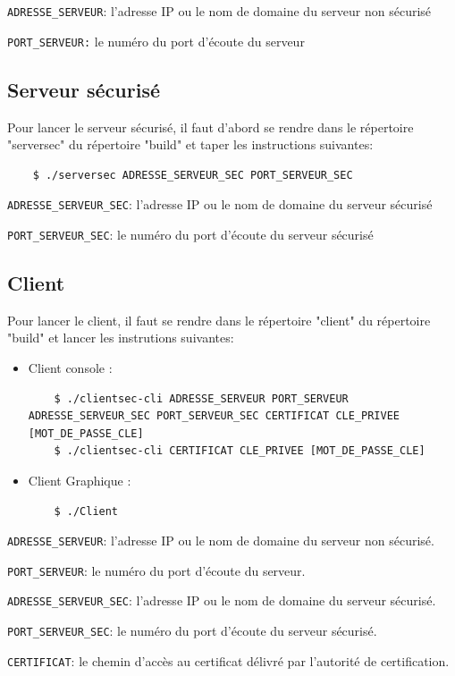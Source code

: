 \documentclass[a4paper,11pt,french]{book}
\begin{document}
\verb+ADRESSE_SERVEUR+: l'adresse IP ou le nom de domaine du serveur non sécurisé

\verb+PORT_SERVEUR:+ le numéro du port d'écoute du serveur

\subsection{Serveur sécurisé}
Pour lancer le serveur sécurisé, il faut d'abord se rendre dans le répertoire "serversec" du répertoire "build" et taper les instructions suivantes:
\begin{verbatim}
    $ ./serversec ADRESSE_SERVEUR_SEC PORT_SERVEUR_SEC
\end{verbatim}

\verb+ADRESSE_SERVEUR_SEC+: l'adresse IP ou le nom de domaine du serveur sécurisé

\verb+PORT_SERVEUR_SEC+: le numéro du port d'écoute du serveur sécurisé

\subsection{Client}
Pour lancer le client, il faut se rendre dans le répertoire "client" du répertoire "build" et lancer les instrutions suivantes:
\begin{itemize}
\item Client console : 
\begin{verbatim}
    $ ./clientsec-cli ADRESSE_SERVEUR PORT_SERVEUR ADRESSE_SERVEUR_SEC PORT_SERVEUR_SEC CERTIFICAT CLE_PRIVEE [MOT_DE_PASSE_CLE]
    $ ./clientsec-cli CERTIFICAT CLE_PRIVEE [MOT_DE_PASSE_CLE]
\end{verbatim}
\item Client Graphique :
\begin{verbatim}
    $ ./Client
\end{verbatim}
\end{itemize}

\verb+ADRESSE_SERVEUR+: l'adresse IP ou le nom de domaine du serveur non sécurisé.

\verb+PORT_SERVEUR+: le numéro du port d'écoute du serveur.

\verb+ADRESSE_SERVEUR_SEC+: l'adresse IP ou le nom de domaine du serveur sécurisé.

\verb+PORT_SERVEUR_SEC+: le numéro du port d'écoute du serveur sécurisé.

\verb+CERTIFICAT+: le chemin d'accès au certificat délivré par l'autorité de certification.
\end{document}
